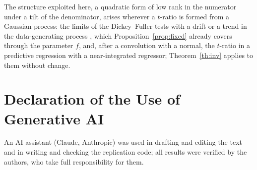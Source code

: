 \documentclass[ecta,nameyear,final]{econsocart}
\theoremstyle{plain}
\theoremstyle{definition}
\begin{document}
The structure exploited here, a quadratic form of low rank in the numerator under a tilt of the denominator, arises wherever a $t$-ratio is formed from a Gaussian process: the limits of the Dickey--Fuller tests with a drift or a trend in the data-generating process \citep{NabeyaSorensen1994}, which Proposition~\ref{prop:fixed} already covers through the parameter $f$, and, after a convolution with a normal, the $t$-ratio in a predictive regression with a near-integrated regressor; Theorem~\ref{th:inv} applies to them without change.

\section*{Declaration of the Use of Generative AI}
An AI assistant (Claude, Anthropic) was used in drafting and editing the text and in writing and checking the replication code; all results were verified by the authors, who take full responsibility for them.
\end{document}
